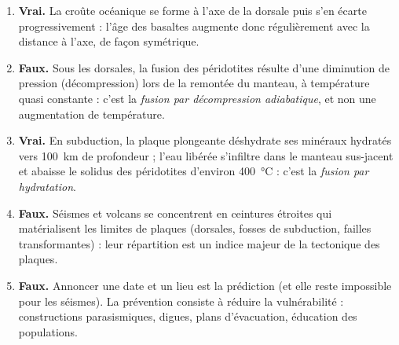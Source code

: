 \documentclass[11pt]{article}
\newcommand{\cle}[1]{{\popxbold\color{popdark}#1}}
\begin{document}
\begin{corrige}
\begin{enumerate}
\item \textbf{Vrai.} La croûte océanique se forme à l'axe de la dorsale puis s'en écarte progressivement : l'âge des basaltes augmente donc régulièrement avec la distance à l'axe, de façon symétrique.
\item \textbf{Faux.} Sous les dorsales, la fusion des péridotites résulte d'une \cle{diminution de pression} (décompression) lors de la remontée du manteau, à température quasi constante : c'est la \emph{fusion par décompression adiabatique}, et non une augmentation de température.
\item \textbf{Vrai.} En subduction, la plaque plongeante déshydrate ses minéraux hydratés vers \SI{100}{km} de profondeur ; l'eau libérée s'infiltre dans le manteau sus-jacent et abaisse le solidus des péridotites d'environ \SI{400}{\celsius} : c'est la \emph{fusion par hydratation}.
\item \textbf{Faux.} Séismes et volcans se concentrent en ceintures étroites qui matérialisent les \cle{limites de plaques} (dorsales, fosses de subduction, failles transformantes) : leur répartition est un indice majeur de la tectonique des plaques.
\item \textbf{Faux.} Annoncer une date et un lieu est la \cle{prédiction} (et elle reste impossible pour les séismes). La \cle{prévention} consiste à réduire la vulnérabilité : constructions parasismiques, digues, plans d'évacuation, éducation des populations.
\end{enumerate}
\end{corrige}
\end{document}
